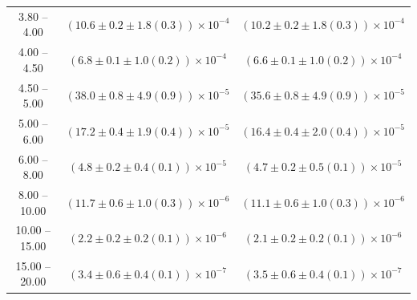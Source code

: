 \begin{table}
\begin{center}
\begin{tabular}{ c | c c }
3.80 -- 4.00 & $(10.6\pm0.2\pm1.8(0.3))\times10^{-4}$ & $(10.2\pm0.2\pm1.8(0.3))\times10^{-4}$ \\ 
4.00 -- 4.50 & $(6.8\pm0.1\pm1.0(0.2))\times10^{-4}$ & $(6.6\pm0.1\pm1.0(0.2))\times10^{-4}$ \\ 
4.50 -- 5.00 & $(38.0\pm0.8\pm4.9(0.9))\times10^{-5}$ & $(35.6\pm0.8\pm4.9(0.9))\times10^{-5}$ \\ 
5.00 -- 6.00 & $(17.2\pm0.4\pm1.9(0.4))\times10^{-5}$ & $(16.4\pm0.4\pm2.0(0.4))\times10^{-5}$ \\ 
6.00 -- 8.00 & $(4.8\pm0.2\pm0.4(0.1))\times10^{-5}$ & $(4.7\pm0.2\pm0.5(0.1))\times10^{-5}$ \\ 
8.00 -- 10.00 & $(11.7\pm0.6\pm1.0(0.3))\times10^{-6}$ & $(11.1\pm0.6\pm1.0(0.3))\times10^{-6}$ \\ 
10.00 -- 15.00 & $(2.2\pm0.2\pm0.2(0.1))\times10^{-6}$ & $(2.1\pm0.2\pm0.2(0.1))\times10^{-6}$ \\ 
15.00 -- 20.00 & $(3.4\pm0.6\pm0.4(0.1))\times10^{-7}$ & $(3.5\pm0.6\pm0.4(0.1))\times10^{-7}$ \\ 
\hline
\end{tabular}
\end{center}
\end{table}
 
